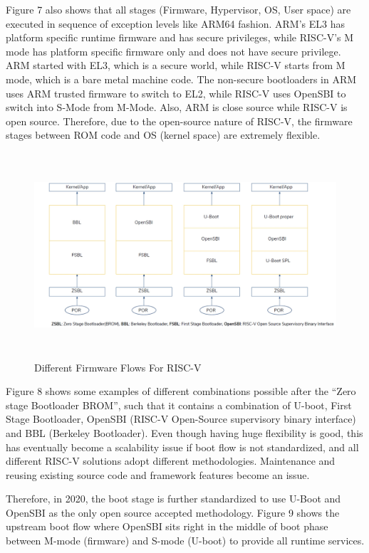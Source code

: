 \documentclass[review]{elsarticle}
\begin{document}
Figure 7 also shows that all stages (Firmware, Hypervisor, OS, User space) are executed in sequence of exception levels like ARM64 fashion. ARM’s EL3 has platform specific runtime firmware and has secure privileges, while RISC-V’s M mode has platform specific firmware only and does not have secure privilege. ARM started with EL3, which is a secure world, while RISC-V starts from M mode, which is a bare metal machine code. The non-secure bootloaders in ARM uses ARM trusted firmware to switch to EL2, while RISC-V uses OpenSBI to switch into S-Mode from M-Mode. Also, ARM is close source while RISC-V is open source. Therefore, due to the open-source nature of RISC-V, the firmware stages between ROM code and OS (kernel space) are extremely flexible.

\begin{figure}[H]
	\centering
	\includegraphics[width=1\textwidth,height=3in]{figs/DifferentFirmwareFlowsForRiscV.JPG}
	\caption{Different Firmware Flows For RISC-V \cite{R51:1}}
\end{figure}


Figure 8 shows some examples of different combinations possible after the “Zero stage Bootloader BROM”, such that it contains a combination of U-boot, First Stage Bootloader, OpenSBI (RISC-V Open-Source supervisory binary interface) and BBL (Berkeley Bootloader). Even though having huge flexibility is good, this has eventually become a scalability issue if boot flow is not standardized, and all different RISC-V solutions adopt different methodologies. Maintenance and reusing existing source code and framework features become an issue.

Therefore, in 2020, the boot stage is further standardized to use U-Boot and OpenSBI as the only open source accepted methodology. Figure 9 shows the upstream boot flow where OpenSBI sits right in the middle of boot phase between M-mode (firmware) and S-mode (U-boot) to provide all runtime services.
\end{document}
